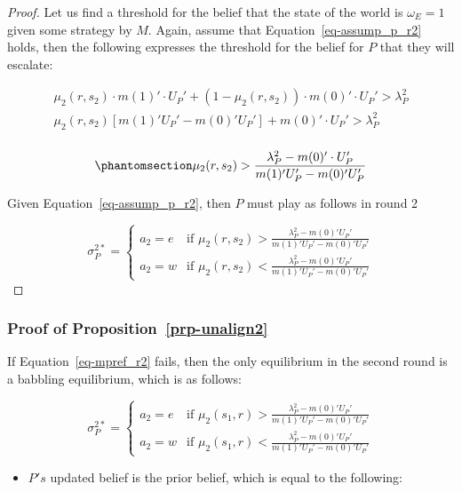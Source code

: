 \documentclass[
  12pt,
]{article}
\providecommand{\tightlist}{%
  \setlength{\itemsep}{0pt}\setlength{\parskip}{0pt}}\usepackage{longtable,booktabs,array}
\theoremstyle{plain}
\theoremstyle{plain}
\theoremstyle{remark}
\begin{document}
\begin{proof}
Let us find a threshold for the belief that the state of the world is
\(\omega_E = 1\) given some strategy by \(M\). Again, assume that
Equation~\ref{eq-assump_p_r2} holds, then the following expresses the
threshold for the belief for \(P\) that they will escalate:

\[
\begin{aligned}
\mu_2(r, s_2) \cdot m(1)' \cdot U_P' + (1 - \mu_2(r, s_2)) \cdot m(0)' \cdot U_P' > \lambda^2_P \\
\mu_2(r, s_2) [m(1)' U_P' - m(0)' U_P'] +  m(0)' \cdot U_P' > \lambda^2_P\\
\end{aligned}
\]

\begin{equation}\phantomsection\label{eq-cutpoint_r2}{
\mu_2(r, s_2) > \frac{\lambda^2_P -  m(0)' \cdot U_P'}{m(1)' U_P' - m(0)' U_P'}
}\end{equation}

Given Equation~\ref{eq-assump_p_r2}, then \(P\) must play as follows in
round 2

\[
\sigma_P^{2*} = 
\begin{cases} 
a_2 = e & \text{if } \mu_2(r, s_2) > \frac{\lambda^2_P - m(0)' U_P '}{m(1)' U_P' - m(0)' U_P'}\\
a_2 = w & \text{if } \mu_2(r, s_2) < \frac{\lambda^2_P - m(0)' U_P '}{m(1)' U_P' - m(0)' U_P'}
\end{cases}
\]
\end{proof}

\subsubsection{\texorpdfstring{Proof of
Proposition~\ref{prp-unalign2}}{Proof of Proposition~}}\label{proof-of-prp-unalign2}

If Equation~\ref{eq-mpref_r2} fails, then the only equilibrium in the
second round is a babbling equilibrium, which is as follows:

\[
\sigma_P^{2*} = 
\begin{cases} 
a_2 = e & \text{if } \mu_2(s_1, r) > \frac{\lambda^2_P - m(0)' U_P '}{m(1)' U_P' - m(0)' U_P'}\\
a_2 = w & \text{if } \mu_2(s_1, r) < \frac{\lambda^2_P - m(0)' U_P '}{m(1)' U_P' - m(0)' U_P'}
\end{cases}
\]

\begin{itemize}
\tightlist
\item
  \(P's\) updated belief is the prior belief, which is equal to the
  following:
\end{itemize}
\end{document}
